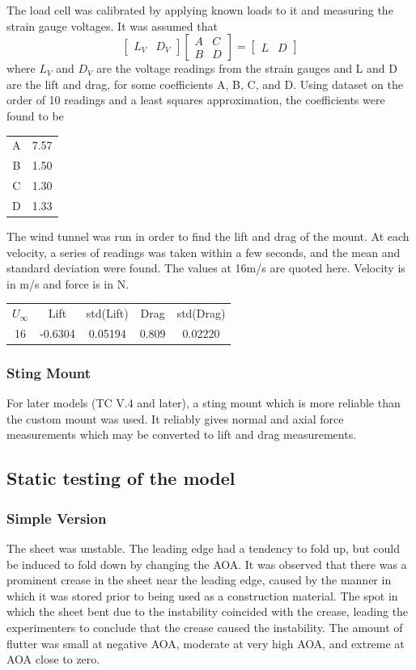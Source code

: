 \documentclass[12pt]{report} %
\begin{document}
The load cell was calibrated by applying known loads to it and measuring the strain gauge voltages.  It was assumed that
\[
\begin{bmatrix}
L_V & D_V
\end{bmatrix}
\begin{bmatrix}
A & C\\
B & D
\end{bmatrix}
=
\begin{bmatrix}
L & D
\end{bmatrix}
\]
where $L_V$ and $D_V$ are the voltage readings from the strain gauges and L and D are the lift and drag, for some coefficients A, B, C,
and D.  Using dataset on the order of 10 readings and a least squares approximation, the coefficients were found to be

\begin{tabular}{c|c}
A & 7.57\\
B & 1.50\\
C & 1.30\\
D & 1.33
\end{tabular}

The wind tunnel was run in order to find the lift and drag of the mount.  At each velocity, a series of readings was taken within
a few seconds, and the mean and standard deviation were found.  The values at 16m/s are quoted here.  Velocity is in m/s and force
is in N.
\begin{tabular}{c c c c c}
$U_\infty$ & Lift & std(Lift) & Drag & std(Drag)\\
16 & -0.6304 & 0.05194 & 0.809 & 0.02220
\end{tabular}

\subsubsection{Sting Mount}

For later models (TC V.4 and later), a sting mount which is more reliable than the custom mount was used. It reliably gives normal and
axial force measurements which may be converted to lift and drag measurements.

\subsection{Static testing of the model}

\subsubsection{Simple Version}
The sheet was unstable.  The leading edge had a tendency to fold up,
but could be induced to fold down by changing the AOA.  It was observed that there was a prominent crease in the sheet near
the leading edge, caused by the manner in which it was stored prior to being used as a construction material.  The spot in which
the sheet bent due to the instability coincided with the crease, leading the experimenters to conclude that the crease caused the
instability.  The amount of flutter was small at negative AOA, moderate at very high AOA, and extreme at AOA close to zero.
\end{document}
